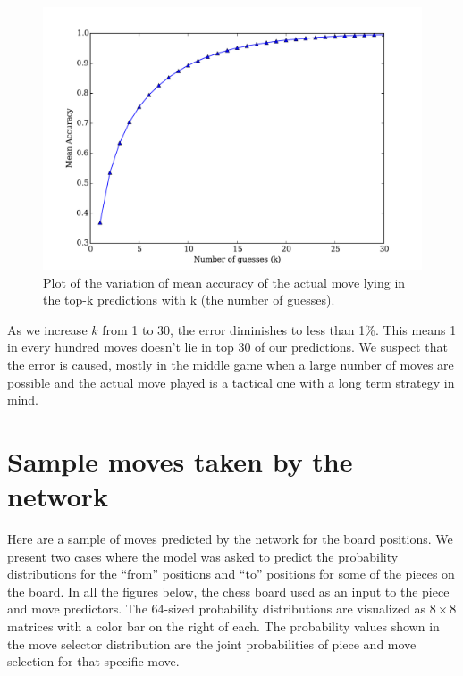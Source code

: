 \begin{figure}[H]
  \includegraphics[width=1.0\textwidth,center]{plots/accuracy2_new.pdf}
  \caption[Variation of Top-k accuracy with k]{
  Plot of the variation of mean accuracy of the actual move lying in the 
top-k predictions with k (the number of guesses).}
  \label{figure:gameplay2}
\end{figure}
As we increase $k$ from 1 to 30, the error diminishes to less than 1\%. This 
means 1 in every hundred moves doesn't lie in top 30 of our predictions. We 
suspect that the error is caused, mostly in the middle game when a large number 
of moves are possible and the actual move played is a tactical one with a long 
term strategy in mind.

\section{Sample moves taken by the network}
\label{section:samplemoves}

Here are a sample of moves predicted by the network for the board positions. We 
present two cases where the model was asked to predict the probability 
distributions for the ``from'' positions and ``to'' positions for some of the 
pieces on the board. In all the figures below, the chess board used as an input 
to the piece and move predictors. The 64-sized probability distributions are 
visualized as $8\times 8$ matrices with a color bar on the right of each. The 
probability values shown in the move selector distribution are the joint 
probabilities of piece and move selection for that specific move. 
